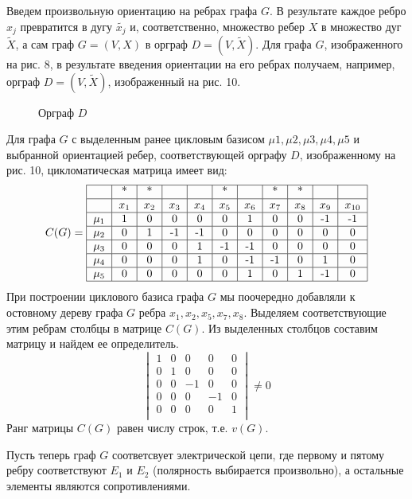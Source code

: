 \documentclass[12pt, letterpaper, titlepage]{article}
\begin{document}
Введем произвольную ориентацию на ребрах графа $G$. В результате каждое ребро $x_j$ превратится
в дугу $\tilde{x_j}$ и, соответственно, множество ребер $X$ в множество дуг $\widetilde{X}$,
а сам граф $G=(V,X)$ в орграф $D=(V,\widetilde{X})$. Для графа $G$, изображенного на рис. 8,
в результате введения ориентации на его ребрах получаем, например, орграф $D=(V, \widetilde{X})$,
изображенный на рис. 10.
\begin{figure}[H]\centering\caption{Орграф $D$}\end{figure}
Для графа $G$ с выделенным ранее цикловым базисом $\mu1,\mu2,\mu3,\mu4,\mu5$ и выбранной ориентацией ребер,
соответствующей орграфу $D$, изображенному на рис. 10, цикломатическая матрица имеет вид:
\[
C(G)=
\begin{tabular}{|c|c|c|c|c|c|c|c|c|c|c|}
    \hline
    &*&*&&&*&&*&*&&\\
    \hline
    & $x_1$ & $x_2$ & $x_3$ & $x_4$ & $x_5$ & $x_6$ & $x_7$ & $x_8$ & $x_9$ & $x_{10}$\\
    \hline
    $\mu_1$ & 1 & 0 & 0 & 0 & 0 & 1 & 0 & 0 & -1 & -1 \\
    \hline
    $\mu_2$ & 0 & 1 & -1 & -1 & 0 & 0 & 0 & 0& 0& 0\\
    \hline
    $\mu_3$ & 0 & 0 & 0 & 1 & -1 & -1 & 0& 0& 0& 0 \\
    \hline
    $\mu_4$ & 0 & 0 & 0 & 1 & 0 & -1 & -1&0& 1& 0 \\
    \hline
    $\mu_5$ & 0 & 0 & 0 & 0 & 0 & 1 & 0 &1& -1& 0 \\
    \hline
\end{tabular}
\]
При построении циклового базиса графа $G$ мы поочередно добавляли к остовному дереву
графа $G$ ребра $x_1,x_2,x_5,x_7,x_8$. Выделяем соответствующие этим ребрам столбцы
в матрице $C(G)$. Из выделенных столбцов составим матрицу и найдем ее определитель.
\[
    \begin{vmatrix}
    1&0&0&0&0\\
    0&1&0&0&0\\
    0&0&-1&0&0\\
    0&0&0&-1&0\\
    0&0&0&0&1\\
    \end{vmatrix}
    \neq0
\]
Ранг матрицы $C(G)$ равен числу строк, т.е. $v(G)$.

Пусть теперь граф $G$ соответсвует электрической цепи, где первому и пятому ребру соответствуют
$E_1$ и $E_2$ (полярность выбирается произвольно), а остальные элементы являются сопротивлениями.
\end{document}
